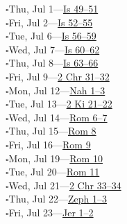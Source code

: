 \hypertarget{rp-2027-07-01}{}\noindent$\square$\enspace Thu, Jul 1\enspace---\enspace \hyperlink{ch-isaiah-49}{Is 49--51}\\
\hypertarget{rp-2027-07-02}{}\noindent$\square$\enspace Fri, Jul 2\enspace---\enspace \hyperlink{ch-isaiah-52}{Is 52--55}\\
\hypertarget{rp-2027-07-06}{}\noindent$\square$\enspace Tue, Jul 6\enspace---\enspace \hyperlink{ch-isaiah-56}{Is 56--59}\\
\hypertarget{rp-2027-07-07}{}\noindent$\square$\enspace Wed, Jul 7\enspace---\enspace \hyperlink{ch-isaiah-60}{Is 60--62}\\
\hypertarget{rp-2027-07-08}{}\noindent$\square$\enspace Thu, Jul 8\enspace---\enspace \hyperlink{ch-isaiah-63}{Is 63--66}\\
\hypertarget{rp-2027-07-09}{}\noindent$\square$\enspace Fri, Jul 9\enspace---\enspace \hyperlink{ch-2chronicles-31}{2 Chr 31--32}\\
\hypertarget{rp-2027-07-12}{}\noindent$\square$\enspace Mon, Jul 12\enspace---\enspace \hyperlink{ch-nahum-1}{Nah 1--3}\\
\hypertarget{rp-2027-07-13}{}\noindent$\square$\enspace Tue, Jul 13\enspace---\enspace \hyperlink{ch-2kings-21}{2 Ki 21--22}\\
\hypertarget{rp-2027-07-14}{}\noindent$\square$\enspace Wed, Jul 14\enspace---\enspace \hyperlink{ch-romans-6}{Rom 6--7}\\
\hypertarget{rp-2027-07-15}{}\noindent$\square$\enspace Thu, Jul 15\enspace---\enspace \hyperlink{ch-romans-8}{Rom 8}\\
\hypertarget{rp-2027-07-16}{}\noindent$\square$\enspace Fri, Jul 16\enspace---\enspace \hyperlink{ch-romans-9}{Rom 9}\\
\hypertarget{rp-2027-07-19}{}\noindent$\square$\enspace Mon, Jul 19\enspace---\enspace \hyperlink{ch-romans-10}{Rom 10}\\
\hypertarget{rp-2027-07-20}{}\noindent$\square$\enspace Tue, Jul 20\enspace---\enspace \hyperlink{ch-romans-11}{Rom 11}\\
\hypertarget{rp-2027-07-21}{}\noindent$\square$\enspace Wed, Jul 21\enspace---\enspace \hyperlink{ch-2chronicles-33}{2 Chr 33--34}\\
\hypertarget{rp-2027-07-22}{}\noindent$\square$\enspace Thu, Jul 22\enspace---\enspace \hyperlink{ch-zephaniah-1}{Zeph 1--3}\\
\hypertarget{rp-2027-07-23}{}\noindent$\square$\enspace Fri, Jul 23\enspace---\enspace \hyperlink{ch-jeremiah-1}{Jer 1--2}\\
